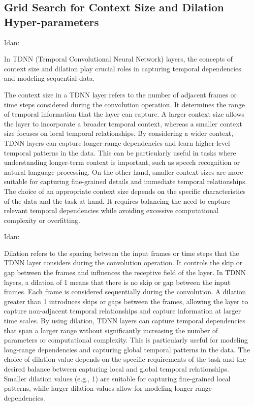 \documentclass[a4paper]{article}
\begin{document}
\subsection{Grid Search for Context Size and Dilation Hyper-parameters}

Idan:

In TDNN (Temporal Convolutional Neural Network) layers, the concepts of context size and dilation play crucial roles in capturing temporal dependencies and modeling sequential data.

The context size in a TDNN layer refers to the number of adjacent frames or time steps considered during the convolution operation. It determines the range of temporal information that the layer can capture. A larger context size allows the layer to incorporate a broader temporal context, whereas a smaller context size focuses on local temporal relationships. By considering a wider context, TDNN layers can capture longer-range dependencies and learn higher-level temporal patterns in the data. This can be particularly useful in tasks where understanding longer-term context is important, such as speech recognition or natural language processing. On the other hand, smaller context sizes are more suitable for capturing fine-grained details and immediate temporal relationships. The choice of an appropriate context size depends on the specific characteristics of the data and the task at hand. It requires balancing the need to capture relevant temporal dependencies while avoiding excessive computational complexity or overfitting.

Idan:

Dilation refers to the spacing between the input frames or time steps that the TDNN layer considers during the convolution operation. It controls the skip or gap between the frames and influences the receptive field of the layer. In TDNN layers, a dilation of 1 means that there is no skip or gap between the input frames. Each frame is considered sequentially during the convolution. A dilation greater than 1 introduces skips or gaps between the frames, allowing the layer to capture non-adjacent temporal relationships and capture information at larger time scales. By using dilation, TDNN layers can capture temporal dependencies that span a larger range without significantly increasing the number of parameters or computational complexity. This is particularly useful for modeling long-range dependencies and capturing global temporal patterns in the data. The choice of dilation value depends on the specific requirements of the task and the desired balance between capturing local and global temporal relationships. Smaller dilation values (e.g., 1) are suitable for capturing fine-grained local patterns, while larger dilation values allow for modeling longer-range dependencies.
\end{document}
